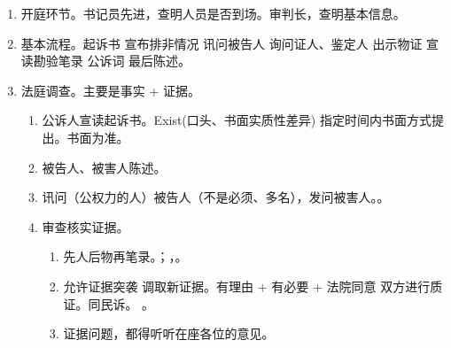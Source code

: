 \begin{enumerate}
\begin{enumerate}
\begin{enumerate}
\begin{enumerate}
                          \item 程序性争议、庭审焦点、必要的庭审准备活动。。
                          \item {}等问题。
                          \item 可以进行附民调解。。
                          \item {} 。。
                        \end{enumerate}
                  \item 明显事实不清，证据不足的案件 \yjt 建议撤诉（）。
                  \item 无异议证据庭审时举证、质证可简化（）。
                  \item 已达成一致意见的事项，If(庭中反悔) + 正当理由才处理。
                \end{enumerate}
          \item 开庭环节。书记员先进，查明人员是否到场。审判长，查明基本信息。
          \item 基本流程。起诉书 \yjt 宣布排非情况 \yjt 讯问被告人 \yjt 询问证人、鉴定人 \yjt 出示物证 \yjt 宣读勘验笔录 \yjt 公诉词 \yjt 最后陈述。
          \item 法庭调查。主要是事实 + 证据。
                \begin{enumerate}
                  \item 公诉人宣读起诉书。Exist(口头、书面实质性差异) \yjt 指定时间内书面方式提出。书面为准。
                  \item 被告人、被害人陈述。
                  \item 讯问（公权力的人）被告人（不是必须、多名），发问被害人。。
                  \item 审查核实证据。
                        \begin{enumerate}
                          \item 先人后物再笔录。；，。
                          \item 允许证据突袭 \hz 调取新证据。有理由 + 有必要 + 法院同意 \yjt 双方进行质证。同民诉。
                                。
                          \item 证据问题，都得听听在座各位的意见。

\end{enumerate}
\end{enumerate}
\end{enumerate}
\end{enumerate}
